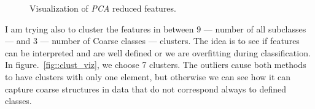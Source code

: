 \documentclass[a4paper, 11pt]{article}
\begin{document}
\begin{figure}[H]
{{\begin{subfloatrow}[3]
{					}
					{
						\caption{The same forms as in figure.~\ref{fig::pca_viz} -- (ii) -- ~\ref{fig::alti_2}.}\label{fig::fused_3}
					}
				\end{subfloatrow}
			}
			{
				\caption*{(iii). Visualization fused features.}
			}
		}
		{
			\caption{\label{fig::pca_viz} Visualization of \textit{PCA} reduced features.}
		}
	\end{figure}

	I am trying also to cluster the features in between $9$ --- number of all subclasses --- and $3$ --- number of Coarse classes --- clusters. The idea is to see if features can be interpreted and are well defined or we are overfitting during classification. In figure.~\ref{fig::clust_viz}, we choose 7 clusters. The outliers cause both methods to have clusters with only one element, but otherwise we can see how it can capture coarse structures in data that do not correspond always to defined classes.
\end{document}
